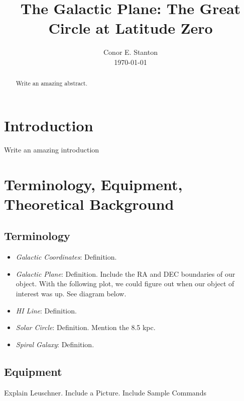 \documentclass[12pt,preprint]{aastex}
\begin{document}
\title{The Galactic Plane: The Great Circle at Latitude Zero}

\author{Conor E. Stanton \\ \today}
\begin{abstract} 
Write an amazing abstract.
\end{abstract}

\tableofcontents
\clearpage

\section{Introduction}
Write an amazing introduction

\section{Terminology, Equipment, Theoretical Background}
\subsection{Terminology}
\begin{itemize}
\item \textit{Galactic Coordinates}: Definition. 
\item \textit{Galactic Plane}: Definition. Include the RA
  and DEC boundaries of our object. With the following plot, we could
  figure out when our object of interest was up. See diagram below.


\item \textit{HI Line}: Definition.
\item \textit{Solar Circle}: Definition. Mention the 8.5 kpc.
\item \textit{Spiral Galaxy}: Definition.

\end{itemize}

\subsection{Equipment}
Explain Leuschner. Include a Picture. Include Sample Commands
\end{document}
